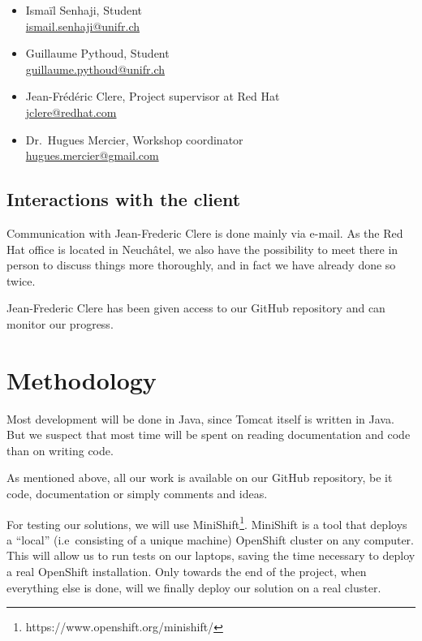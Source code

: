 \documentclass[11pt,a4paper]{article}
\begin{document}
\begin{itemize}
    \item Ismaïl Senhaji, Student \\
        \href{mailto:ismail.senhaji@unifr.ch}{ismail.senhaji@unifr.ch}
    \item Guillaume Pythoud, Student \\
        \href{mailto:guillaume.pythoud@unifr.ch}{guillaume.pythoud@unifr.ch}
    \item Jean-Frédéric Clere, Project supervisor at Red Hat \\
        \href{mailto: jclere@redhat.com}{jclere@redhat.com}
    \item Dr.\ Hugues Mercier, Workshop coordinator \\
        \href{mailto: hugues.mercier@gmail.com}{hugues.mercier@gmail.com}
\end{itemize}

\subsection{Interactions with the client}

Communication with Jean-Frederic Clere is done mainly via e-mail. As the Red
Hat office is located in Neuchâtel, we also have the possibility to meet there
in person to discuss things more thoroughly, and in fact we have already done
so twice.

Jean-Frederic Clere has been given access to our GitHub repository and can
monitor our progress.

\section{Methodology}

Most development will be done in Java, since Tomcat itself is written in Java.
But we suspect that most time will be spent on reading documentation and code
than on writing code.

As mentioned above, all our work is available on our GitHub repository, be it
code, documentation or simply comments and ideas.

For testing our solutions, we will use
MiniShift\footnote{https://www.openshift.org/minishift/}. MiniShift is a tool
that deploys a ``local'' (i.e\ consisting of a unique machine) OpenShift
cluster on any computer. This will allow us to run tests on our laptops, saving
the time necessary to deploy a real OpenShift installation. Only towards the
end of the project, when everything else is done, will we finally deploy our
solution on a real cluster.
\end{document}
